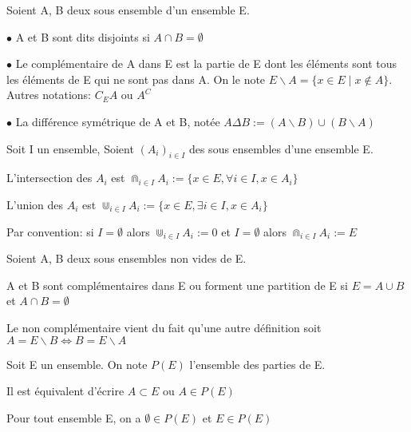 \documentclass[a4paper, 12pt]{article}
\begin{document}
\begin{definition}
    Soient A, B deux sous ensemble d'un ensemble E.

    \item $\bullet$ A et B sont dits disjoints si $A \cap B = \emptyset$
    \item $\bullet$ Le complémentaire de A dans E est la partie de E dont les éléments sont tous les éléments de E qui ne sont pas dans A.
    On le note $E\backslash A = \{x \in E \mid x \notin A\}$. Autres notations: $C_E A$ ou $A^C$
    \item $\bullet$ La différence symétrique de A et B, notée $A \Delta B := (A \backslash B) \cup (B \backslash A)$
\end{definition}


\begin{definition}
    Soit I un ensemble, Soient $(A_i)_{i \in I}$ des sous ensembles d'une ensemble E.

    L'intersection des $A_i$ est $\Cap_{i \in I} A_i := \{x \in E, \forall i \in I, x \in A_i\}$
    
    L'union des $A_i$ est $\Cup_{i \in I} A_i := \{x \in E, \exists i \in I, x \in A_i\}$

    Par convention: si  $I = \emptyset$ alors $\Cup_{i \in I} A_i := 0$ et $I = \emptyset$ alors $\Cap_{i \in I} A_i := E$
\end{definition}

\begin{definition}
    Soient A, B deux sous ensembles non vides de E.

    A et B sont complémentaires dans E ou forment une partition de E si
    $E = A \cup B$ et $A \cap B = \emptyset$
\end{definition}

\begin{remark}
    Le non complémentaire vient du fait qu'une autre définition soit $A = E\backslash B \iff B = E\backslash A$
\end{remark}

Soit E un ensemble. On note $P(E)$ l'ensemble des parties de E.

\begin{remark}
    Il est équivalent d'écrire $A \subset E$ ou $A \in P(E)$
\end{remark}

\begin{remark}
    Pour tout ensemble E, on a $\emptyset \in P(E)$ et $E \in P(E)$
\end{remark}
\end{document}
